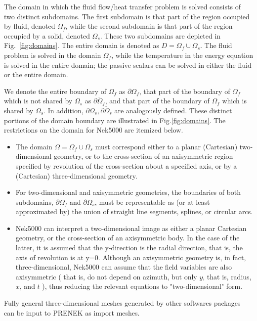 The domain in which the fluid flow/heat transfer
problem is solved consists of two distinct subdomains. The
first subdomain is that part of the region occupied by
fluid, denoted \(\Omega_f\), while the second subdomain is that part
of the region occupied by a solid, denoted \(\Omega_s\). These two
subdomains are depicted in Fig.~\ref{fig:domains}. The entire domain is denoted as \(D=\Omega_f \cup \Omega_s\).
The fluid problem is solved in the domain \(\Omega_f\), while the
temperature in the energy equation is solved in the
entire domain; the passive scalars can be solved in either
the fluid or the entire domain.
  
We denote the entire boundary of \(\Omega_f\) as \(\partial \Omega_f\), that part
of the boundary of \(\Omega_f\) which is not shared by \(\Omega_s\) as
\(\overline{\partial \Omega_f}\), and
that part of the boundary of \(\Omega_f\) which is shared by \(\Omega_s\).
In addition, \(\partial \Omega_{s}, \overline{\partial \Omega_s}\) are analogously defined.
These distinct portions of the
domain boundary are illustrated in Fig.\ref{fig:domains}.
The restrictions on the domain for Nek5000 are itemized below.
\begin{itemize}
\item The domain \(\Omega=\Omega_f \cup \Omega_s\) must correspond either to a
  planar (Cartesian) two-dimensional geometry, or to the
  cross-section of an axisymmetric region specified by
  revolution of the cross-section about a specified axis, or
  by a (Cartesian) three-dimensional geometry.
\item For two-dimensional and axisymmetric geometries, the
  boundaries of both subdomains, \(\partial \Omega_f\) and
  \(\partial \Omega_s\), must be
  representable as (or at least approximated by) the union of
  straight line segments, splines, or circular arcs.
\item Nek5000 can interpret a two-dimensional image as either
  a planar Cartesian geometry, or
  the cross-section of an axisymmetric body. In the case of
  the latter, it is assumed that the y-direction is the radial
  direction, that is, the axis of revolution is at y=0.
  Although an axisymmetric geometry is, in fact,
  three-dimensional, Nek5000 can assume that the field variables
  are also axisymmetric ( that is, do not depend on azimuth,
  but only \(y\), that is, radius, \(x\), and \(t\) ), thus reducing the
  relevant equations to "two-dimensional" form.
\end{itemize}

Fully general three-dimensional meshes generated by other softwares
packages can be input to PRENEK as import meshes.

